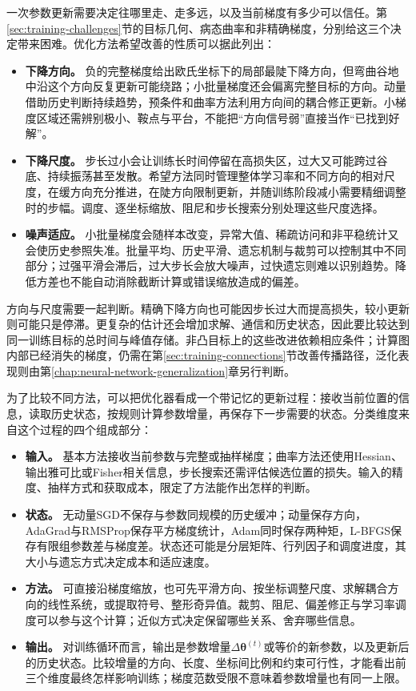 一次参数更新需要决定往哪里走、走多远，以及当前梯度有多少可以信任。第\ref{sec:training-challenges}节的目标几何、病态曲率和非精确梯度，分别给这三个决定带来困难。优化方法希望改善的性质可以据此列出：
\begin{itemize}
  \item \textbf{下降方向。} 负的完整梯度给出欧氏坐标下的局部最陡下降方向，但弯曲谷地中沿这个方向反复更新可能绕路；小批量梯度还会偏离完整目标的方向。动量借助历史判断持续趋势，预条件和曲率方法利用方向间的耦合修正更新。小梯度区域还需辨别极小、鞍点与平台，不能把“方向信号弱”直接当作“已找到好解”。
  \item \textbf{下降尺度。} 步长过小会让训练长时间停留在高损失区，过大又可能跨过谷底、持续振荡甚至发散。希望方法同时管理整体学习率和不同方向的相对尺度，在缓方向充分推进，在陡方向限制更新，并随训练阶段减小需要精细调整时的步幅。调度、逐坐标缩放、阻尼和步长搜索分别处理这些尺度选择。
  \item \textbf{噪声适应。} 小批量梯度会随样本改变，异常大值、稀疏访问和非平稳统计又会使历史参照失准。批量平均、历史平滑、遗忘机制与裁剪可以控制其中不同部分；过强平滑会滞后，过大步长会放大噪声，过快遗忘则难以识别趋势。降低方差也不能自动消除截断计算或错误缩放造成的偏差。
\end{itemize}
方向与尺度需要一起判断。精确下降方向也可能因步长过大而提高损失，较小更新则可能只是停滞。更复杂的估计还会增加求解、通信和历史状态，因此要比较达到同一训练目标的总时间与峰值存储。非凸目标上的这些改进依赖相应条件；计算图内部已经消失的梯度，仍需在第\ref{sec:training-connections}节改善传播路径，泛化表现则由第\ref{chap:neural-network-generalization}章另行判断。

为了比较不同方法，可以把优化器看成一个带记忆的更新过程：接收当前位置的信息，读取历史状态，按规则计算参数增量，再保存下一步需要的状态。分类维度来自这个过程的四个组成部分：
\begin{itemize}
  \item \textbf{输入。} 基本方法接收当前参数与完整或抽样梯度；曲率方法还使用Hessian、输出雅可比或Fisher相关信息，步长搜索还需评估候选位置的损失。输入的精度、抽样方式和获取成本，限定了方法能作出怎样的判断。
  \item \textbf{状态。} 无动量SGD不保存与参数同规模的历史缓冲；动量保存方向，AdaGrad与RMSProp保存平方梯度统计，Adam同时保存两种矩，L-BFGS保存有限组参数差与梯度差。状态还可能是分层矩阵、行列因子和调度进度，其大小与遗忘方式决定成本和适应速度。
  \item \textbf{方法。} 可直接沿梯度缩放，也可先平滑方向、按坐标调整尺度、求解耦合方向的线性系统，或提取符号、整形奇异值。裁剪、阻尼、偏差修正与学习率调度可以参与这个计算；近似方式决定保留哪些关系、舍弃哪些信息。
  \item \textbf{输出。} 对训练循环而言，输出是参数增量$\Delta\bm\theta^{(t)}$或等价的新参数，以及更新后的历史状态。比较增量的方向、长度、坐标间比例和约束可行性，才能看出前三个维度最终怎样影响训练；梯度范数受限不意味着参数增量也有同一上限。
\end{itemize}

